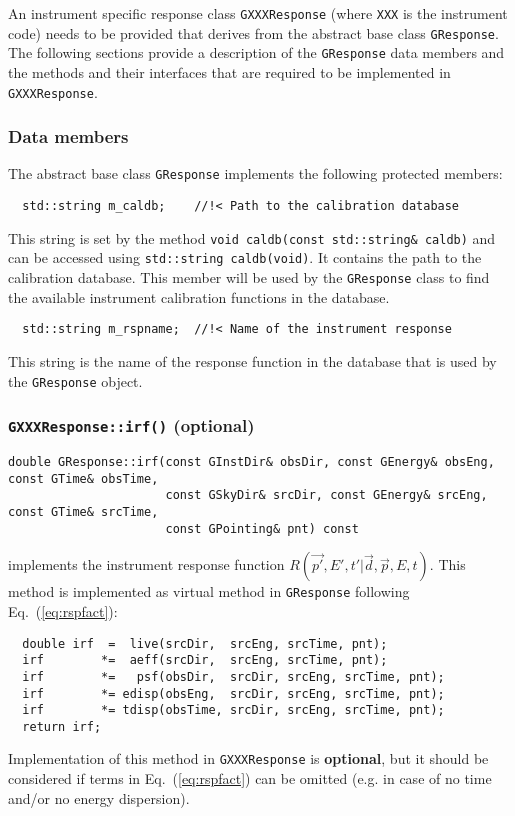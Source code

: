 \documentclass{article}[12pt,a4]
\begin{document}

An instrument specific response class {\tt GXXXResponse} (where {\tt XXX} is the instrument code)
needs to be provided that derives from the abstract base class {\tt GResponse}.
The following sections provide a description of the {\tt GResponse} data members and the
methods and their interfaces that are required to be implemented in {\tt GXXXResponse}.


\subsubsection{Data members}

The abstract base class {\tt GResponse} implements the following protected members:

\begin{verbatim}
  std::string m_caldb;    //!< Path to the calibration database
\end{verbatim}
This string is set by the method {\tt void caldb(const std::string\& caldb)} and can be
accessed using {\tt std::string caldb(void)}.
It contains the path to the calibration database.
This member will be used by the {\tt GResponse} class to find the available instrument
calibration functions in the database.

\begin{verbatim}
  std::string m_rspname;  //!< Name of the instrument response
\end{verbatim}
This string is the name of the response function in the database that is used by the
{\tt GResponse} object.


\subsubsection{{\tt GXXXResponse::irf()} (optional)}
\label{sec:GXXXResponse::irf}

\begin{verbatim}
double GResponse::irf(const GInstDir& obsDir, const GEnergy& obsEng, const GTime& obsTime,
                      const GSkyDir& srcDir, const GEnergy& srcEng, const GTime& srcTime,
                      const GPointing& pnt) const
\end{verbatim}
implements the instrument response function $R(\vec{p'}, E', t' | \vec{d}, \vec{p}, E, t)$.
This method is implemented as virtual method in {\tt GResponse} following
Eq.~(\ref{eq:rspfact}):
\begin{verbatim}
  double irf  =  live(srcDir,  srcEng, srcTime, pnt);
  irf        *=  aeff(srcDir,  srcEng, srcTime, pnt);
  irf        *=   psf(obsDir,  srcDir, srcEng, srcTime, pnt);
  irf        *= edisp(obsEng,  srcDir, srcEng, srcTime, pnt);
  irf        *= tdisp(obsTime, srcDir, srcEng, srcTime, pnt);
  return irf;
\end{verbatim}
Implementation of this method in {\tt GXXXResponse} is {\bf optional}, but it should
be considered if terms in Eq.~(\ref{eq:rspfact}) can be omitted (e.g. in case of no time
and/or no energy dispersion).
\end{document}

